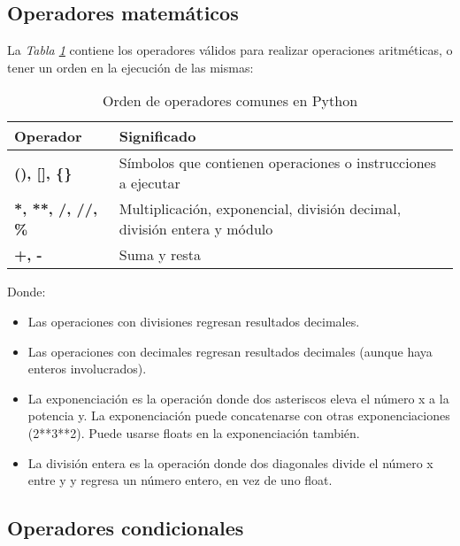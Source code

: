 \subsection{Operadores matemáticos}

La \textit{Tabla \ref{tab: 2}} contiene los operadores válidos para realizar operaciones aritméticas, o tener un orden en la ejecución de las mismas:
\begin{table}[H]
    \begin{center}
        \caption{Orden de operadores comunes en Python}
        \label{tab: 2}
        \begin{tabular}{m{3cm} m{10cm}}
            \hline
            \textbf{Operador} & \textbf{Significado} \\
            \hline
            \textbf{(), [], \{\}}		& Símbolos que contienen operaciones o instrucciones a ejecutar \\
            \textbf{*, **, /, //, \%}	& Multiplicación, exponencial, división decimal, división entera y módulo \\
            \textbf{+, -}				& Suma y resta \\
            \hline
        \end{tabular}
    \end{center}
\end{table}

Donde:
\begin{itemize}
	\item Las operaciones con divisiones regresan resultados decimales.
	\item Las operaciones con decimales regresan resultados decimales (aunque haya enteros involucrados).
	\item La exponenciación es la operación donde dos asteriscos eleva el número x a la potencia y. La exponenciación puede concatenarse con otras exponenciaciones (2**3**2). Puede usarse floats en la exponenciación también.
	\item La división entera es la operación donde dos diagonales divide el número x entre y y regresa un número entero, en vez de uno float.
\end{itemize}


\subsection{Operadores condicionales}

